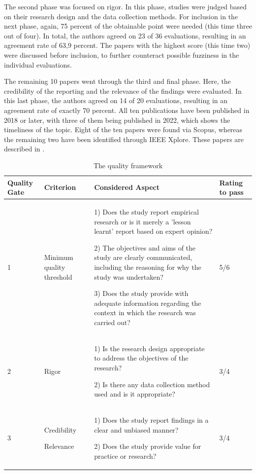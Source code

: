 \documentclass[a4paper,11pt,article,oneside]{memoir}
\begin{document}
The second phase was focused on rigor. In this phase, studies were judged based on their research design and the data collection methods. For inclusion in the next phase, again, 75 percent of the obtainable point were needed (this time three out of four). In total, the authors agreed on 23 of 36 evaluations, resulting in an agreement rate of 63,9 percent. The papers with the highest score (this time two) were discussed before inclusion, to further counteract possible fuzziness in the individual evaluations.  




The remaining 10 papers went through the third and final phase. Here, the credibility of the reporting and the relevance of the findings were evaluated. In this last phase, the authors agreed on 14 of 20 evaluations, resulting in an agreement rate of exactly 70 percent. All ten publications have been published in 2018 or later, with three of them being published in 2022, which shows the timeliness of the topic. Eight of the ten papers were found via Scopus, whereas the remaining two have been identified through IEEE Xplore. These papers are described in \citet{foundPapers}.

\begin{table}
    \renewcommand{\arraystretch}{1}
    \caption[]{The quality framework}
    \begin{tabular}{|p{1cm}|p{2cm}|p{10cm}|p{1.5cm}|}
        \hline
        Quality Gate & Criterion & Considered Aspect & Rating to pass \\ 

        \hline

        1 & Minimum quality threshold & 
        
        1) Does the study report empirical research or is it merely a 'lesson learnt' report based on expert opinion?

        2) The objectives and aims of the study are clearly communicated, including the reasoning for why the study was undertaken?

        3) Does the study provide with adequate information regarding the context in which the research was carried out?
        & 5/6 \\ 
        \hline
        2 & Rigor & 
        
        1) Is the research design appropriate to address the objectives of the research?

        2) Is there any data collection method used and is it appropriate?
        & 3/4 \\ 
        \hline  
        3 &
         Credibility 

         Relevance 
        & 
        1) Does the study report findings in a clear and unbiased manner?

        2) Does the study provide value for practice or research?
        & 
        3/4 \\ 
        \hline   
    \end{tabular}
    \label{qualityFramework}
\end{table}
\end{document}
